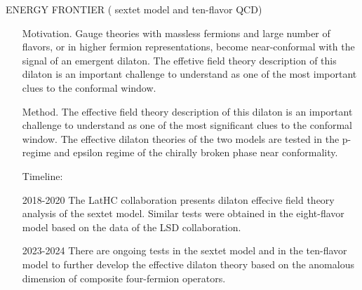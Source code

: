 \documentclass[prd,showpacs,showkeys,preprintnumbers,floatfix,
nofootinbib%
]{revtex4-2}
\begin{document}
\newpage

ENERGY FRONTIER  ( sextet model and ten-flavor QCD)

\begin{itemize}
	\item[Motivation.]  Gauge theories with massless fermions and large number of flavors, or in higher fermion representations, become near-conformal with the signal of an emergent dilaton. The effetive field theory description of this dilaton is an important challenge to understand as one of the most important clues to the conformal window.
   	\item[Method.] The effective field theory description of this dilaton is an important challenge to understand as one of the most significant clues to the conformal window. The  effective dilaton theories of the two models are tested in the p-regime and epsilon regime of the chirally broken phase near conformality.
	\item[Timeline:]
\item[2018-2020]   	The LatHC collaboration presents dilaton effecive field theory analysis  of  the sextet model. Similar tests were obtained in the eight-flavor model based on the data of the LSD collaboration.
\item[2023-2024]   There are ongoing tests in the sextet model and in the ten-flavor model to further develop the effective dilaton theory based on the anomalous dimension of composite four-fermion operators.

   	
\end{itemize}
\end{document}
